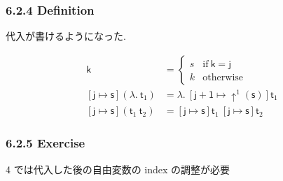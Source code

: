 \documentclass[13pt,dvipdfm]{beamer}
\begin{document}
\frame
{
  \frametitle{6.2.4 Definition}
  代入が書けるようになった. \\

  \begin{definition}
    \begin{align*}
      [\mathsf{j} \mapsto \mathsf{s}]\mathsf{k} &=
      \begin{cases}
        s & \text{if}\ \mathsf{k} = \mathsf{j} \\
        k & \text{otherwise}
      \end{cases} \\
      [\mathsf{j} \mapsto \mathsf{s}](\lambda.\ \mathsf{t}_1) &=
      \lambda.\ [\mathsf{j+1} \mapsto \uparrow^{1} (\mathsf{s})]\mathsf{t}_1 \\
      [\mathsf{j} \mapsto \mathsf{s}](\mathsf{t}_1\ \mathsf{t}_2) &=
      [\mathsf{j} \mapsto \mathsf{s}]\mathsf{t}_1\ [\mathsf{j} \mapsto \mathsf{s}]\mathsf{t}_2
    \end{align*}
  \end{definition}
}


\frame
{
  \frametitle{6.2.5 Exercise}

  4 では代入した後の自由変数の index の調整が必要
}
\end{document}
